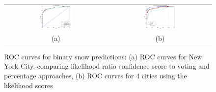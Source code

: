 \begin{figure}
\begin{center}
\hspace{-0.25in}
\small{
\begin{tabular}{cc}
\includegraphics[width=0.36\textwidth,clip,trim=0.4in 0 0.8in 0]{plots/nyc_snow_ROC.png} &
\hspace{15pt}
\includegraphics[width=0.36\textwidth,clip,trim=0.4in 0 0.8in 0]{plots/city_cmp_snow_ROC.png} \\

(a) & (b)  
\end{tabular}
}
\end{center}
\vspace{-6pt}
\caption{ROC curves for binary snow predictions: (a) ROC curves for New York City, comparing likelihood
ratio confidence score to voting and percentage approaches, (b) ROC curves for 4 cities using the likelihood
scores}
\label{fig:city_roc}
\vspace{-6pt}
\end{figure}








%
%

